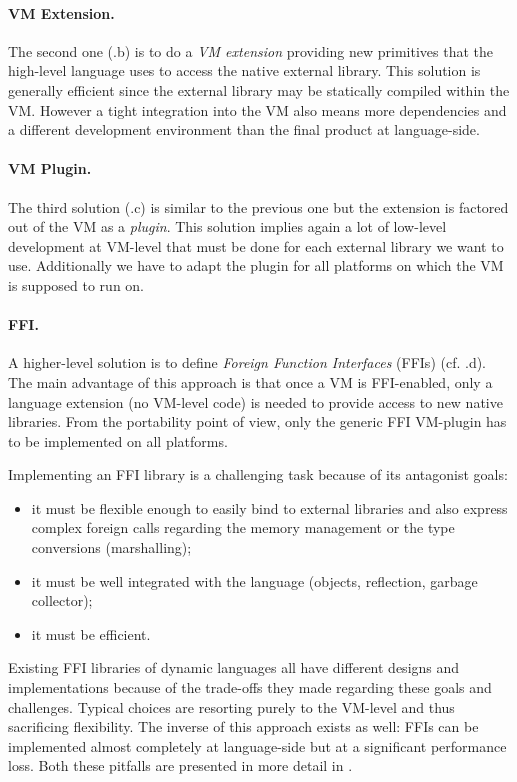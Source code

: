 \paragraph{VM Extension.}
The second one (.b) is to do a \emph{VM extension} providing new primitives that the high-level language uses to access the native external library.
This solution is generally efficient since the external library may be statically compiled within the VM.
However a tight integration into the VM also means more dependencies and a different development environment than the final product at language-side.

\paragraph{VM Plugin.}
The third solution (.c) is similar to the previous one but the extension is factored out of the VM as a \emph{plugin}.
This solution implies again a lot of low-level development at VM-level that must be done for each external library we want to use.
Additionally we have to adapt the plugin for all platforms on which the VM is supposed to run on.

\paragraph{FFI.}
A higher-level solution is to define \emph{Foreign Function Interfaces} (FFIs) (cf. .d).
The main advantage of this approach is that once a VM is FFI-enabled, only a language extension (no VM-level code) is needed to provide access to new native libraries.
From the portability point of view, only the generic FFI VM-plugin has to be implemented on all platforms.

Implementing an FFI library is a challenging task because of its antagonist goals:
\begin{itemize}
    \item it must be flexible enough to easily bind to external libraries and also express complex foreign calls regarding the memory management or the type conversions (marshalling);
    \item it must be well integrated with the language (objects, reflection, garbage collector);
    \item it must be efficient.
\end{itemize}
%
Existing FFI libraries of dynamic languages all have different designs and implementations because of the trade-offs they made regarding these goals and challenges.
Typical choices are resorting purely to the VM-level and thus sacrificing flexibility.
The inverse of this approach exists as well: FFIs can be implemented almost completely at language-side but at a significant performance loss.
Both these pitfalls are presented in more detail in .


